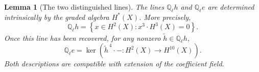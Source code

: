 \documentclass[11pt, reqno]{amsart}
\newtheorem{lemma}[theorem]{Lemma}
\theoremstyle{definition}
\newcommand\QQ{\mathbb{Q}}
\begin{document}
\begin{lemma}[The two distinguished lines]
\label{lem:distinguished-lines}
The lines $\QQ_\ell h$ and $\QQ_\ell e$ are determined intrinsically by
the graded algebra $H^*(X)$.  More precisely,
\begin{equation}
\label{eqn:hyperplane-line}
\QQ_\ell h
=
\left\{
x\in H^2(X):x^3\cdot H^3(X)=0
\right\}.
\end{equation}
Once this line has been recovered, for any nonzero
$\widetilde h\in\QQ_\ell h$,
\begin{equation}
\label{eqn:exceptional-line}
\QQ_\ell e
=
\ker\left(
\widetilde h^{\,4}\cdot-:
H^2(X)\longrightarrow H^{10}(X)
\right).
\end{equation}
Both descriptions are compatible with extension of the coefficient
field.
\end{lemma}
\end{document}
